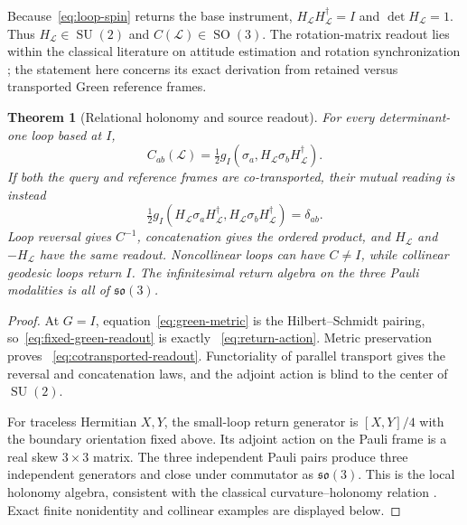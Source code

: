 \documentclass[12pt]{article}
\newtheorem{theorem}{Theorem}[section]
\theoremstyle{definition}
\theoremstyle{remark}
\newcommand{\SO}{\operatorname{SO}}
\newcommand{\SU}{\operatorname{SU}}
\begin{document}
Because~\eqref{eq:loop-spin} returns the base instrument,
$H_{\mathcal L}H_{\mathcal L}^{\dagger}=I$ and
$\det H_{\mathcal L}=1$.  Thus $H_{\mathcal L}\in\SU(2)$ and
$C(\mathcal L)\in\SO(3)$.  The rotation-matrix readout lies within the
classical literature on attitude estimation and rotation synchronization
\cite{Wahba1965,WangSinger2013}; the statement here concerns its exact
derivation from retained versus transported Green reference frames.

\begin{theorem}[Relational holonomy and source readout]
\label{thm:relational-holonomy}
For every determinant-one loop based at $I$,
\begin{equation}\label{eq:fixed-green-readout}
 C_{ab}(\mathcal L)
 =\tfrac12 g_I\!\left(
 \sigma_a,H_{\mathcal L}\sigma_bH_{\mathcal L}^{\dagger}\right).
\end{equation}
If both the query and reference frames are co-transported, their mutual
reading is instead
\begin{equation}\label{eq:cotransported-readout}
 \tfrac12g_I(H_{\mathcal L}\sigma_aH_{\mathcal L}^{\dagger},
             H_{\mathcal L}\sigma_bH_{\mathcal L}^{\dagger})
 =\delta_{ab}.
\end{equation}
Loop reversal gives $C^{-1}$, concatenation gives the ordered product, and
$H_{\mathcal L}$ and $-H_{\mathcal L}$ have the same readout.  Noncollinear
loops can have $C\ne I$, while collinear geodesic loops return $I$.  The
infinitesimal return algebra on the three Pauli modalities is all of
$\mathfrak{so}(3)$.
\end{theorem}

\begin{proof}
At $G=I$, equation~\eqref{eq:green-metric} is the Hilbert--Schmidt pairing,
so~\eqref{eq:fixed-green-readout} is exactly
~\eqref{eq:return-action}.  Metric preservation proves
~\eqref{eq:cotransported-readout}.  Functoriality of parallel transport gives
the reversal and concatenation laws, and the adjoint action is blind to the
center of $\SU(2)$.

For traceless Hermitian $X,Y$, the small-loop return generator is
$[X,Y]/4$ with the boundary orientation fixed above.  Its adjoint action on
the Pauli frame is a real skew $3\times3$ matrix.  The three independent
Pauli pairs produce three independent generators and close under commutator
as $\mathfrak{so}(3)$.  This is the local holonomy algebra, consistent with
the classical curvature--holonomy relation \cite{AmbroseSinger1953}.
Exact finite nonidentity and collinear examples are displayed below.
\end{proof}
\end{document}
